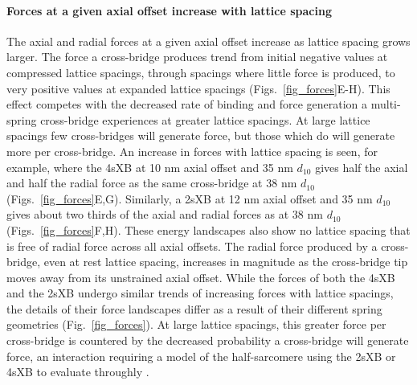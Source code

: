 \documentclass[]{article}
\begin{document}
\paragraph{Forces at a given axial offset increase with lattice spacing} %
The axial and radial forces at a given axial offset increase as lattice spacing grows larger.
The force a cross-bridge produces trend from initial negative values at compressed lattice spacings, through spacings where little force is produced, to very positive values at expanded lattice spacings (Figs.~\ref{fig_forces}E-H). 
This effect competes with the decreased rate of binding and force generation a multi-spring cross-bridge experiences at greater lattice spacings. 
At large lattice spacings few cross-bridges will generate force, but those which do will generate more per cross-bridge. 
An increase in forces with lattice spacing is seen, for example, where the 4sXB at 10 nm axial offset and 35 nm $d_{10}$ gives half the axial and half the radial force as the same cross-bridge at 38 nm $d_{10}$ (Figs.~\ref{fig_forces}E,G). 
Similarly, a 2sXB at 12 nm axial offset and 35 nm $d_{10}$ gives about two thirds of the axial and radial forces as at 38 nm $d_{10}$ (Figs.~\ref{fig_forces}F,H).  
These energy landscapes also show no lattice spacing that is free of radial force across all axial offsets.  
The radial force produced by a cross-bridge, even at rest lattice spacing, increases in magnitude as the cross-bridge tip moves away from its unstrained axial offset. 
While the forces of both the 4sXB and the 2sXB undergo similar trends of increasing forces with lattice spacings, the details of their force landscapes differ as a result of their different spring geometries (Fig.~\ref{fig_forces}). 
At large lattice spacings, this greater force per cross-bridge is countered by the decreased probability a cross-bridge will generate force, an interaction requiring a model of the half-sarcomere using the 2sXB or 4sXB to evaluate throughly \citep{Martyn2004}. 
\end{document}
